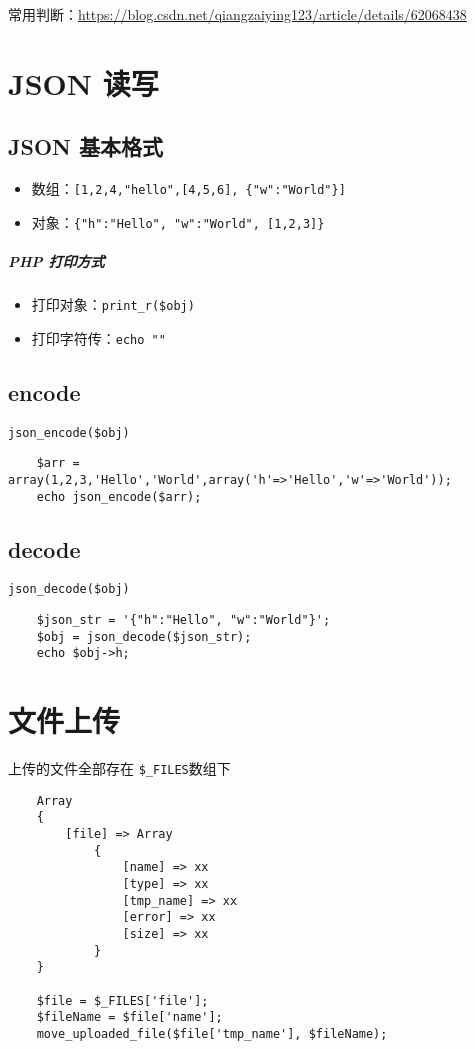 \documentclass[UTF8,a4paper,12pt]{ctexbook}
\begin{document}
			常用判断：\url{https://blog.csdn.net/qiangzaiying123/article/details/62068438}
	
	\section{JSON 读写}
		\subsection{JSON 基本格式}
			\begin{itemize}
				\item 数组：\verb|[1,2,4,"hello",[4,5,6], {"w":"World"}]|
				\item 对象：\verb|{"h":"Hello", "w":"World", [1,2,3]}|
			\end{itemize}
		
			\subparagraph{PHP 打印方式}
				\begin{itemize}
					\item 打印对象：\verb|print_r($obj)|
					\item 打印字符传：\verb|echo ""|
				\end{itemize}
			
		\subsection{encode}
			\verb|json_encode($obj)|
			
			\begin{lstlisting}
	$arr = array(1,2,3,'Hello','World',array('h'=>'Hello','w'=>'World'));
	echo json_encode($arr);
			\end{lstlisting}
		
		\subsection{decode}
			\verb|json_decode($obj)|
			
			\begin{lstlisting}
	$json_str = '{"h":"Hello", "w":"World"}';
	$obj = json_decode($json_str);
	echo $obj->h;
			\end{lstlisting}
		
	\section{文件上传}
		上传的文件全部存在 \verb|$_FILES|数组下
		\begin{lstlisting}
	Array
	{
		[file] => Array
			{
				[name] => xx
				[type] => xx
				[tmp_name] => xx
				[error] => xx
				[size] => xx
			}
	}
	
	$file = $_FILES['file'];
	$fileName = $file['name'];
	move_uploaded_file($file['tmp_name'], $fileName);
		\end{lstlisting}
	
\end{document}

